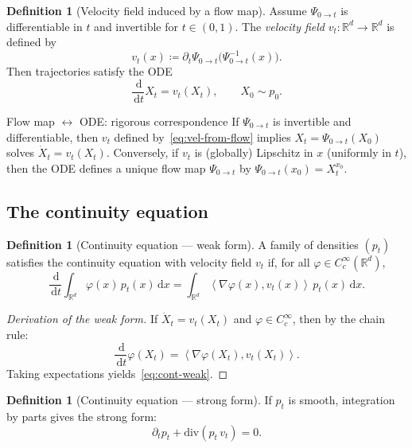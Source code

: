 \documentclass[11pt]{article}
\newcommand{\R}{\mathbb{R}}
\newcommand{\grad}{\nabla}
\newcommand{\diver}{\mathrm{div}}
\newcommand{\inner}[2]{\left\langle #1,#2 \right\rangle}
\newcommand{\dd}{\,\mathrm{d}}
\theoremstyle{definition}
\newtheorem{definition}[theorem]{Definition}
\theoremstyle{remark}
\begin{document}
\begin{definition}[Velocity field induced by a flow map]\label{def:vel-from-flow}
Assume $\Psi_{0\to t}$ is differentiable in $t$ and invertible for $t\in(0,1)$.
The \emph{velocity field} $v_t:\R^d\to\R^d$ is defined by
\begin{equation}\label{eq:vel-from-flow}
v_t(x) \coloneqq \partial_t \Psi_{0\to t}\!\big(\Psi_{0\to t}^{-1}(x)\big).
\end{equation}
Then trajectories satisfy the ODE
\begin{equation}\label{eq:flow-ode}
\frac{\dd}{\dd t}X_t = v_t(X_t), \qquad X_0 \sim p_0.
\end{equation}
\end{definition}

\begin{warnbox}{Flow map $\longleftrightarrow$ ODE: rigorous correspondence}
If $\Psi_{0\to t}$ is invertible and differentiable, then $v_t$ defined by~\eqref{eq:vel-from-flow} implies $X_t = \Psi_{0\to t}(X_0)$ solves $\dot{X}_t = v_t(X_t)$.
Conversely, if $v_t$ is (globally) Lipschitz in $x$ (uniformly in $t$), then the ODE defines a unique flow map $\Psi_{0\to t}$ by $\Psi_{0\to t}(x_0) = X_t^{x_0}$.
\end{warnbox}

\subsection{The continuity equation}

\begin{definition}[Continuity equation --- weak form]\label{def:cont-weak}
A family of densities $(p_t)$ satisfies the continuity equation with velocity field $v_t$ if, for all $\varphi\in C_c^\infty(\R^d)$,
\begin{equation}\label{eq:cont-weak}
\frac{\dd}{\dd t}\int_{\R^d} \varphi(x)\,p_t(x)\dd x = \int_{\R^d} \inner{\grad\varphi(x)}{v_t(x)}\,p_t(x)\dd x.
\end{equation}
\end{definition}

\begin{proof}[Derivation of the weak form]
If $\dot{X}_t = v_t(X_t)$ and $\varphi\in C_c^\infty$, then by the chain rule:
\[
\frac{\dd}{\dd t}\varphi(X_t) = \inner{\grad\varphi(X_t)}{v_t(X_t)}.
\]
Taking expectations yields~\eqref{eq:cont-weak}.
\end{proof}

\begin{definition}[Continuity equation --- strong form]\label{def:cont-strong}
If $p_t$ is smooth, integration by parts gives the strong form:
\begin{equation}\label{eq:cont-strong}
\partial_t p_t + \diver(p_t\,v_t) = 0.
\end{equation}
\end{definition}
\end{document}
